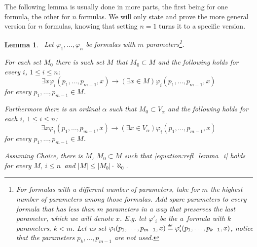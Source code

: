\documentclass[12pt,a4paper]{article}
\newtheorem{lemma}[theorem]{Lemma}
\newcommand{\then}{\rightarrow}
\newcommand{\bce}{\begin{compactenum}}
\newcommand{\ece}{\end{compactenum}}
\newcommand\defeq{\mathrel{\overset{\makebox[0pt]{\mbox{\normalfont\tiny\sffamily def}}}{=}}}
\begin{document}
The following lemma is usually done in more parts, the first being for one formula, the other for $n$ formulas. We will only state and prove the more general version for $n$ formulas, knowing that setting $n=1$ turns it to a specific version.

\begin{lemma}\label{lemma:reflection_lemma}\
Let $\varphi_1, \ldots, \varphi_n$ be formulas with $m$ parameters\footnote{For formulas with a different number of parameters, take for $m$ the highest number of parameters among those formulas. Add spare parameters to every formula that has less than $m$ parameters in a way that preserves the last parameter, which we will denote $x$. E.g. let $\varphi'_i$ be the a~formula with $k$ parameters, $k < m$. Let us set $\varphi_i(p_1, \ldots, p_{m-1}, x) \defeq \varphi'_i(p_1, \ldots, p_{k-1}, x)$, notice that the parameters $p_k, \ldots, p_{m-1}$ are not used.}.
\bce[(i)]
\item For each set $M_0$ there is such set $M$ that $M_0 \subset M$ and the following holds for every $i$, $1 \leq i \leq n$:
\begin{equation}\label{equation:refl_lemma_i}
\exists x \varphi_i(p_1, \ldots, p_{m-1}, x) \then (\exists x \in M) \varphi_i(p_1, \ldots, p_{m-1}, x)
\end{equation}
for every $p_1, \ldots, p_{m-1} \in M$.

\item Furthermore there is an ordinal $\alpha$ such that $M_0 \subset V_\alpha$ and the following holds for each $i$, $1 \leq i \leq n$:
\begin{equation}\label{equation:refl_lemma_ii}
\exists x \varphi_i(p_1, \ldots, p_{m-1}, x) \then (\exists x \in V_\alpha) \varphi_i(p_1, \ldots, p_{m-1}, x)
\end{equation}
for every $p_1, \ldots, p_{m-1} \in M$.

\item Assuming \emph{Choice}, there is $M$, $M_0 \subset M$ such that \ref{equation:refl_lemma_i} holds for every $M,\ i \leq n$ and $|M| \leq |M_0| \cdot \aleph_0$.
\ece
\end{lemma}
\end{document}

